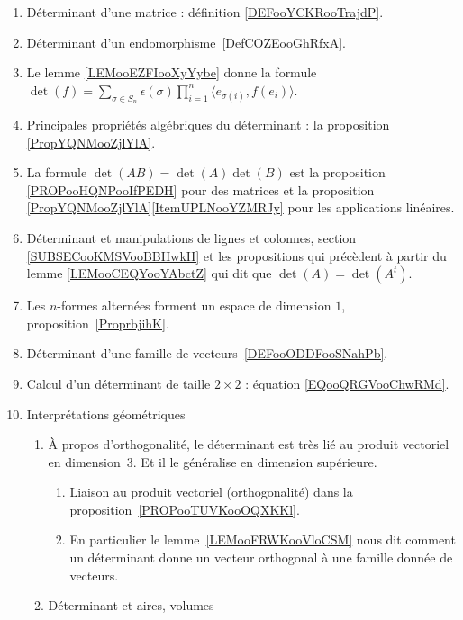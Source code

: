 
     \label{THMooUXJMooOroxbI}
\begin{enumerate}
	\item
	      Déterminant d'une matrice : définition \ref{DEFooYCKRooTrajdP}.
	\item
	      Déterminant d'un endomorphisme~\ref{DefCOZEooGhRfxA}.
	\item
	      Le lemme \ref{LEMooEZFIooXyYybe} donne la formule \( \det(f)=\sum_{\sigma\in S_n}\epsilon(\sigma)\prod_{i=1}^n\langle e_{\sigma(i)}, f(e_i)\rangle\).
	\item
	      Principales propriétés algébriques du déterminant : la proposition \ref{PropYQNMooZjlYlA}.
	\item
	      La formule \( \det(AB)=\det(A)\det(B)\) est la proposition \ref{PROPooHQNPooIfPEDH} pour des matrices et la proposition \ref{PropYQNMooZjlYlA}\ref{ItemUPLNooYZMRJy} pour les applications linéaires.
	\item
	      Déterminant et manipulations de lignes et colonnes, section \ref{SUBSECooKMSVooBBHwkH} et les propositions qui précèdent à partir du lemme \ref{LEMooCEQYooYAbctZ} qui dit que \( \det(A)=\det(A^t)\).
	\item
	      Les \( n\)-formes alternées forment un espace de dimension \( 1\), proposition~\ref{ProprbjihK}.
	\item
	      Déterminant d'une famille de vecteurs~\ref{DEFooODDFooSNahPb}.
	\item
	      Calcul d'un déterminant de taille \( 2\times 2\) : équation \eqref{EQooQRGVooChwRMd}.
	\item
	      Interprétations géométriques
	      \begin{enumerate}
		      \item
		            À propos d'orthogonalité, le déterminant est très lié au produit vectoriel en dimension~\( 3\). Et il le généralise en dimension supérieure.
		            \begin{enumerate}
			            \item
			                  Liaison au produit vectoriel (orthogonalité) dans la proposition~\ref{PROPooTUVKooOQXKKl}.
			            \item
			                  En particulier le lemme~\ref{LEMooFRWKooVloCSM} nous dit comment un déterminant donne un vecteur orthogonal à une famille donnée de vecteurs.
		            \end{enumerate}
		      \item
		            Déterminant et aires, volumes
		            \begin{enumerate}

\end{enumerate}
\end{enumerate}
\end{enumerate}
